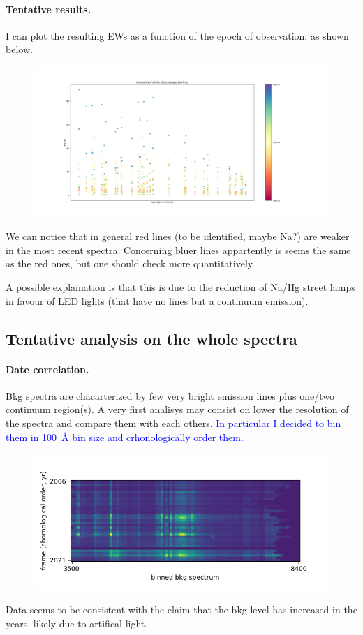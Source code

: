 \documentclass{article}
\newcommand{\arbitrario}[1]{\textcolor{blue}{#1}}
\begin{document}
\paragraph{Tentative results.} I can plot the resulting EWs as a function of the epoch of observation, as shown below.
\begin{figure}[h!]
	\centering
	\includegraphics[width=.9\textwidth]{../EWs}
\end{figure}
We can notice that in general red lines (to be identified, maybe Na?) are weaker in the most recent spectra. Concerning bluer lines appartently is seems the same as the red ones, but one should check more quantitatively.

A possible explaination is that this is due to the reduction of Na/Hg street lamps in favour of LED lights (that have no lines but a continuum emission).

\subsection{Tentative analysis on the whole spectra}

\paragraph{Date correlation.}
Bkg spectra are chacarterized by few very bright emission lines plus one/two continuum region(s). A very first analisys may consist on lower the resolution of the spectra and compare them with each others. \arbitrario{In particular I decided to bin them in \SI{100}{\angstrom} bin size and crhonologically order them.}
\begin{figure}[h!]
	\centering
	\includegraphics[width=.75\textwidth]{../Figure_1}
\end{figure}
Data seems to be consistent with the claim that the bkg level has increased in the years, likely due to artifical light.
\end{document}

